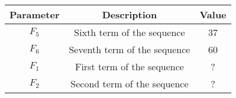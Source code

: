 \begin{tabular}{|c|c|c|}
    \hline
    \textbf{Parameter} & \textbf{Description} & \textbf{Value} \\
    \hline
    $ F_5$ & Sixth term of the sequence & 37 \\
    \hline
    $ F_6$ & Seventh term of the sequence & 60 \\
    \hline
    $ F_1$ & First term of the sequence & ? \\
    \hline
    $ F_2$ & Second term of the sequence & ? \\
    \hline
    \end{tabular}

